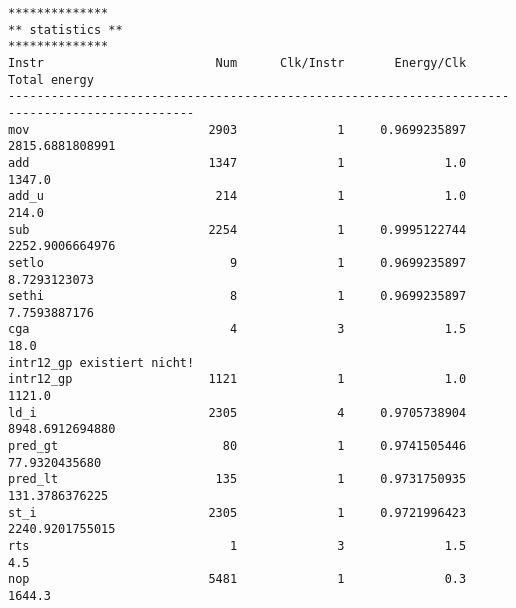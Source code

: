 \documentclass[oneside,11pt,accentcolor=tud2b, nochapname]{tudexercise}
\begin{document}
\begin{lstlisting}[caption={Endausgabe für das Ziel Performance-Max (Instanz 6x6) },captionpos=b, float, label={lst:performance}]
**************
** statistics **
**************
Instr          	             Num	  Clk/Instr	      Energy/Clk	    Total energy	
------------------------------------------------------------------------------------------------
mov            	            2903	          1	    0.9699235897	 2815.6881808991	
add            	            1347	          1	             1.0	          1347.0	
add_u          	             214	          1	             1.0	           214.0	
sub            	            2254	          1	    0.9995122744	 2252.9006664976	
setlo          	               9	          1	    0.9699235897	    8.7293123073	
sethi          	               8	          1	    0.9699235897	    7.7593887176	
cga            	               4	          3	             1.5	            18.0	
intr12_gp existiert nicht!
intr12_gp      	            1121	          1	             1.0	          1121.0	
ld_i           	            2305	          4	    0.9705738904	 8948.6912694880	
pred_gt        	              80	          1	    0.9741505446	   77.9320435680	
pred_lt        	             135	          1	    0.9731750935	  131.3786376225	
st_i           	            2305	          1	    0.9721996423	 2240.9201755015	
rts            	               1	          3	             1.5	             4.5	
nop            	            5481	          1	             0.3	          1644.3	




\end{lstlisting}
\end{document}

